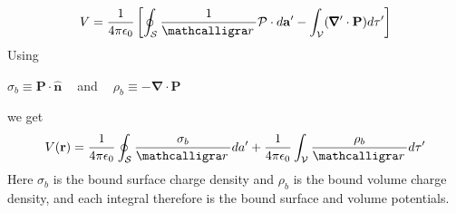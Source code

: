 \documentclass[a4paper,11pt]{article}
\begin{document}
\begin{alphalist}
        \[
            V = \frac{1}{4\pi\epsilon_0}\left[\oint_{\mathcal{S}} \frac{1}{\scriptr}\mathcal{P} \cdot d\mathbf{a}' - \int_{\mathcal{V}}(\pmb{\nabla}' \cdot \mathbf{P}) d\tau'\right]
        \]
        Using 
        \begin{center}
            $\sigma_b \equiv \mathbf{P} \cdot \mathbf{\hat{n}}\:\:\:\:$ and $\:\:\:\:\rho_b \equiv - \pmb{\nabla} \cdot \mathbf{P}$
        \end{center}
        we get
        \[
            V(\mathbf{r}) = \frac{1}{4\pi\epsilon_0}\oint_{\mathcal{S}}\frac{\sigma_b}{\scriptr}da' + \frac{1}{4\pi\epsilon_0}\int_{\mathcal{V}}\frac{\rho_b}{\scriptr}d\tau'
        \]
        Here $\sigma_b$ is the bound surface charge density and $\rho_b$ is the bound volume charge density, and each integral therefore is the bound surface and volume potentials.
\end{alphalist}
\end{document}
